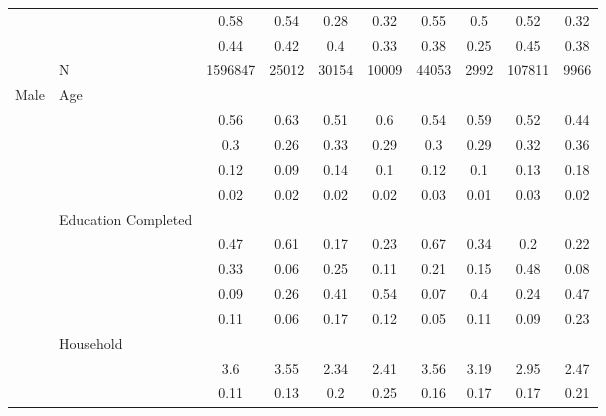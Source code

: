 \begin{table}[ht]
\begin{tabular}{l>{\raggedright\arraybackslash}p{3.2cm}|cccccccc}
   & \multicolumn{1}{>{\raggedleft\arraybackslash}p{2.9cm}|}{\makebox[2.9cm][r]{Lives with Child }} & 0.58 & 0.54 & 0.28 & 0.32 & 0.55 & 0.5 & 0.52 & 0.32 \\ 
   & \multicolumn{1}{>{\raggedleft\arraybackslash}p{3.4cm}|}{\makebox[3.4cm][r]{Married/Cohabiting }} & 0.44 & 0.42 & 0.4 & 0.33 & 0.38 & 0.25 & 0.45 & 0.38 \\ 
   & N & 1596847 & 25012 & 30154 & 10009 & 44053 & 2992 & 107811 & 9966 \\ 
  Male & Age &  &  &  &  &  &  &  &  \\ 
   & \multicolumn{1}{>{\raggedleft\arraybackslash}p{1.5cm}|}{\makebox[1.5cm][r]{60 - 69 }} & 0.56 & 0.63 & 0.51 & 0.6 & 0.54 & 0.59 & 0.52 & 0.44 \\ 
   & \multicolumn{1}{>{\raggedleft\arraybackslash}p{1.5cm}|}{\makebox[1.5cm][r]{70 - 79 }} & 0.3 & 0.26 & 0.33 & 0.29 & 0.3 & 0.29 & 0.32 & 0.36 \\ 
   & \multicolumn{1}{>{\raggedleft\arraybackslash}p{1.5cm}|}{\makebox[1.5cm][r]{80 - 89 }} & 0.12 & 0.09 & 0.14 & 0.1 & 0.12 & 0.1 & 0.13 & 0.18 \\ 
   & \multicolumn{1}{>{\raggedleft\arraybackslash}p{1.5cm}|}{\makebox[1.5cm][r]{90 plus }} & 0.02 & 0.02 & 0.02 & 0.02 & 0.03 & 0.01 & 0.03 & 0.02 \\ 
   & Education Completed &  &  &  &  &  &  &  &  \\ 
   & \multicolumn{1}{>{\raggedleft\arraybackslash}p{3.2cm}|}{\makebox[3.2cm][r]{Less than Primary }} & 0.47 & 0.61 & 0.17 & 0.23 & 0.67 & 0.34 & 0.2 & 0.22 \\ 
   & \multicolumn{1}{>{\raggedleft\arraybackslash}p{1.7cm}|}{\makebox[1.7cm][r]{Primary }} & 0.33 & 0.06 & 0.25 & 0.11 & 0.21 & 0.15 & 0.48 & 0.08 \\ 
   & \multicolumn{1}{>{\raggedleft\arraybackslash}p{2cm}|}{\makebox[2cm][r]{Secondary }} & 0.09 & 0.26 & 0.41 & 0.54 & 0.07 & 0.4 & 0.24 & 0.47 \\ 
   & \multicolumn{1}{>{\raggedleft\arraybackslash}p{2cm}|}{\makebox[2cm][r]{University }} & 0.11 & 0.06 & 0.17 & 0.12 & 0.05 & 0.11 & 0.09 & 0.23 \\ 
   & Household &  &  &  &  &  &  &  &  \\ 
   & \multicolumn{1}{>{\raggedleft\arraybackslash}p{2.7cm}|}{\makebox[2.7cm][r]{Household Size }} & 3.6 & 3.55 & 2.34 & 2.41 & 3.56 & 3.19 & 2.95 & 2.47 \\ 
   & \multicolumn{1}{>{\raggedleft\arraybackslash}p{2.2cm}|}{\makebox[2.2cm][r]{Lives Alone }} & 0.11 & 0.13 & 0.2 & 0.25 & 0.16 & 0.17 & 0.17 & 0.21 \\ 

\end{tabular}
\end{table}
